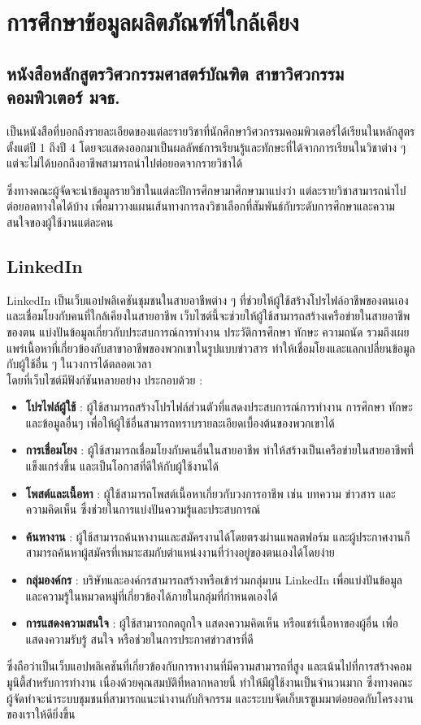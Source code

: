 \section{การศึกษาข้อมูลผลิตภัณฑ์ที่ใกล้เคียง}
\subsection{หนังสือหลักสูตรวิศวกรรมศาสตร์บัณฑิต สาขาวิศวกรรมคอมพิวเตอร์ มจธ.}
เป็นหนังสือที่บอกถึงรายละเอียดของแต่ละรายวิชาที่นักศึกษาวิศวกรรมคอมพิวเตอร์ได้เรียนในหลักสูตรตั้งแต่ปี 1 ถึงปี 4
โดยจะแสดงออกมาเป็นผลลัพธ์การเรียนรู้และทักษะที่ได้จากการเรียนในวิชาต่าง ๆ แต่จะไม่ได้บอกถึงอาชีพสามารถนำไปต่อยอดจากรายวิชาได้
\par ซึ่งทางคณะผู้จัดจะนำข้อมูลรายวิชาในแต่ละปีการศึกษามาศึกษามาแบ่งว่า แต่ละรายวิชาสามารถนำไปต่อยอดทางใดได้บ้าง 
เพื่อมาวางแผนเส้นทางการลงวิชาเลือกที่สัมพันธ์กับระดับการศึกษาและความสนใจของผู้ใช้งานแต่ละคน

\subsection{LinkedIn}
LinkedIn เป็นเว็บแอปพลิเคชันชุมชนในสายอาชีพต่าง ๆ ที่ช่วยให้ผู้ใช้สร้างโปรไฟล์อาชีพของตนเองและเชื่อมโยงกับคนที่ใกล้เคียงในสายอาชีพ 
เว็บไซต์นี้จะช่วยให้ผู้ใช้สามารถสร้างเครือข่ายในสายอาชีพของตน แบ่งปันข้อมูลเกี่ยวกับประสบการณ์การทำงาน ประวัติการศึกษา ทักษะ ความถนัด 
รวมถึงเผยแพร่เนื้อหาที่เกี่ยวข้องกับสาขาอาชีพของพวกเขาในรูปแบบข่าวสาร ทำให้เชื่อมโยงและแลกเปลี่ยนข้อมูลกับผู้ใช้อื่น ๆ ในวงการได้ตลอดเวลา \\
โดยที่เว็บไซต์มีฟังก์ชันหลายอย่าง ประกอบด้วย :
\begin{itemize}
    \item \textbf{โปรไฟล์ผู้ใช้} : ผู้ใช้สามารถสร้างโปรไฟล์ส่วนตัวที่แสดงประสบการณ์การทำงาน การศึกษา ทักษะ และข้อมูลอื่นๆ เพื่อให้ผู้ใช้อื่นสามารถทราบรายละเอียดเบื้องต้นของพวกเขาได้
    \item \textbf{การเชื่อมโยง} : ผู้ใช้สามารถเชื่อมโยงกับคนอื่นในสายอาชีพ ทำให้สร้างเป็นเครือข่ายในสายอาชีพที่แข็งแกร่งขึ้น และเป็นโอกาสที่ดีให้กับผู้ใช้งานได้
    \item \textbf{โพสต์และเนื้อหา} : ผู้ใช้สามารถโพสต์เนื้อหาเกี่ยวกับวงการอาชีพ เช่น บทความ ข่าวสาร และความคิดเห็น ซึ่งช่วยในการแบ่งปันความรู้และประสบการณ์
    \item \textbf{ค้นหางาน} : ผู้ใช้สามารถค้นหางานและสมัครงานได้โดยตรงผ่านแพลตฟอร์ม และผู้ประกาศงานก็สามารถค้นหาผู้สมัครที่เหมาะสมกับตำแหน่งงานที่ว่างอยู่ของตนเองได้โดยง่าย
    \item \textbf{กลุ่มองค์กร} : บริษัทและองค์กรสามารถสร้างหรือเข้าร่วมกลุ่มบน LinkedIn เพื่อแบ่งปันข้อมูลและความรู้ในหมวดหมู่ที่เกี่ยวข้องได้ภายในกลุ่มที่กำหนดเองได้
    \item \textbf{การแสดงความสนใจ} : ผู้ใช้สามารถกดถูกใจ แสดงความคิดเห็น หรือแชร์เนื้อหาของผู้อื่น เพื่อแสดงความรับรู้ สนใจ หรือช่วยในการประกาศข่าวสารที่ดี
\end{itemize}
\par ซึ่งถือว่าเป็นเว็บแอปพลิเคชันที่เกี่ยวข้องกับการหางานที่มีความสามารถที่สูง และเน้นไปที่การสร้างคอมมูนิตี้สำหรับการทำงาน เนื่องด้วยคุณสมบัติที่หลากหลายนี้ 
ทำให้มีผู้ใช้งานเป็นจำนวนมาก ซึ่งทางคณะผู้จัดทำจะนำระบบชุมชนที่สามารถแนะนำงานกับกิจกรรม และระบบจัดเก็บเรซูเมมาต่อยอดกับโครงงานของเราให้ดียิ่งขึ้น

